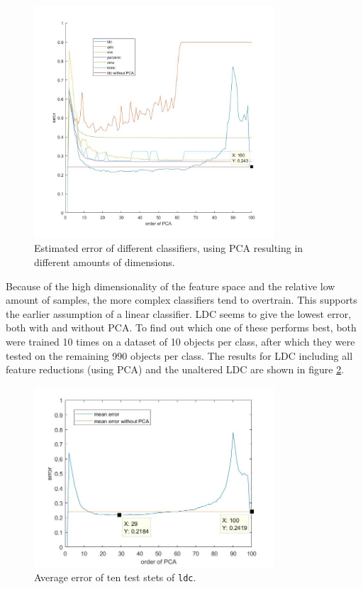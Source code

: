 \begin{figure}[H]
	\centering
	\includegraphics[width = 0.8\textwidth]{images/dissim_all_class.jpg}
	\caption{Estimated error of different classifiers, using PCA resulting in different amounts of dimensions.}
	\label{fig:dissim_all_class}
\end{figure}
\noindent Because of the high dimensionality of the feature space and the relative low amount of samples, the more complex classifiers tend to overtrain. This supports the earlier assumption of a linear classifier. LDC seems to give the lowest error, both with and without PCA. To find out which one of these performs best, both were trained 10 times on a dataset of 10 objects per class, after which they were tested on the remaining 990 objects per class. The results for LDC including all feature reductions (using PCA) and the unaltered LDC are shown in figure \ref{fig:dissim_ldc_mean}.
\begin{figure}[H]
	\centering
	\includegraphics[width = 0.8\textwidth]{images/dissim_ldc_mean.jpg}
	\caption{Average error of ten test stets of \texttt{ldc}.}
	\label{fig:dissim_ldc_mean}
\end{figure}
